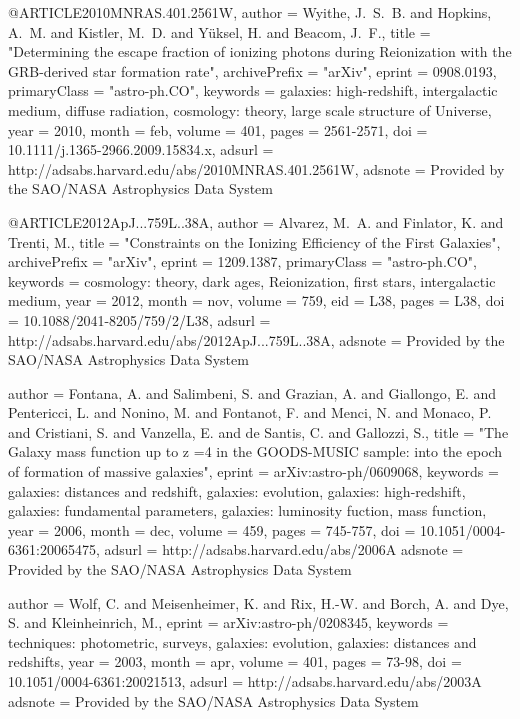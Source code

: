 \documentclass{article}
\begin{document}
@ARTICLE{2010MNRAS.401.2561W,
   author = {{Wyithe}, J.~S.~B. and {Hopkins}, A.~M. and {Kistler}, M.~D. and 
	{Y{\"u}ksel}, H. and {Beacom}, J.~F.},
    title = "{Determining the escape fraction of ionizing photons during Reionization with the GRB-derived star formation rate}",
archivePrefix = "arXiv",
   eprint = {0908.0193},
 primaryClass = "astro-ph.CO",
 keywords = {galaxies: high-redshift, intergalactic medium, diffuse radiation, cosmology: theory, large scale structure of Universe},
     year = 2010,
    month = feb,
   volume = 401,
    pages = {2561-2571},
      doi = {10.1111/j.1365-2966.2009.15834.x},
   adsurl = {http://adsabs.harvard.edu/abs/2010MNRAS.401.2561W},
  adsnote = {Provided by the SAO/NASA Astrophysics Data System}
}
	
@ARTICLE{2012ApJ...759L..38A,
   author = {{Alvarez}, M.~A. and {Finlator}, K. and {Trenti}, M.},
    title = "{Constraints on the Ionizing Efficiency of the First Galaxies}",
archivePrefix = "arXiv",
   eprint = {1209.1387},
 primaryClass = "astro-ph.CO",
 keywords = {cosmology: theory, dark ages, Reionization, first stars, intergalactic medium},
     year = 2012,
    month = nov,
   volume = 759,
      eid = {L38},
    pages = {L38},
      doi = {10.1088/2041-8205/759/2/L38},
   adsurl = {http://adsabs.harvard.edu/abs/2012ApJ...759L..38A},
  adsnote = {Provided by the SAO/NASA Astrophysics Data System}
}  

   author = {{Fontana}, A. and {Salimbeni}, S. and {Grazian}, A. and {Giallongo}, E. and 
	{Pentericci}, L. and {Nonino}, M. and {Fontanot}, F. and {Menci}, N. and 
	{Monaco}, P. and {Cristiani}, S. and {Vanzella}, E. and {de Santis}, C. and 
	{Gallozzi}, S.},
    title = "{The Galaxy mass function up to z =4 in the GOODS-MUSIC sample: into the epoch of formation of massive galaxies}",
   eprint = {arXiv:astro-ph/0609068},
 keywords = {galaxies: distances and redshift, galaxies: evolution, galaxies: high-redshift, galaxies: fundamental parameters, galaxies: luminosity fuction, mass function},
     year = 2006,
    month = dec,
   volume = 459,
    pages = {745-757},
      doi = {10.1051/0004-6361:20065475},
   adsurl = {http://adsabs.harvard.edu/abs/2006A%
  adsnote = {Provided by the SAO/NASA Astrophysics Data System}
}

   author = {{Wolf}, C. and {Meisenheimer}, K. and {Rix}, H.-W. and {Borch}, A. and 
	{Dye}, S. and {Kleinheinrich}, M.},
   eprint = {arXiv:astro-ph/0208345},
 keywords = {techniques: photometric, surveys, galaxies: evolution, galaxies: distances and redshifts},
     year = 2003,
    month = apr,
   volume = 401,
    pages = {73-98},
      doi = {10.1051/0004-6361:20021513},
   adsurl = {http://adsabs.harvard.edu/abs/2003A%
  adsnote = {Provided by the SAO/NASA Astrophysics Data System}
}
\end{document}
